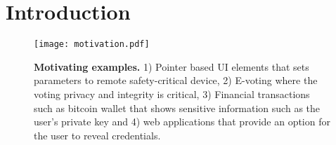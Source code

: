 \section{Introduction}
\label{sec:intro}




\begin{figure}[t]
\centering
\texttt{[image: motivation.pdf]}
\caption{\textbf{Motivating examples.} 1) Pointer based UI elements that sets parameters to remote safety-critical device, 2) E-voting where the voting privacy and integrity is critical, 3) Financial transactions such as bitcoin wallet that shows sensitive information such as the user's private key and 4) web applications that provide an option for the user to reveal credentials.}
\spacesave
\label{fig:motivation}
\centering
\end{figure}


